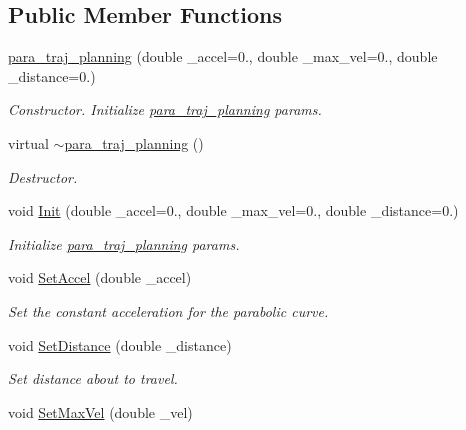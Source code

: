 \subsection*{Public Member Functions}
\begin{DoxyCompactItemize}
\item 
\hyperlink{classnubot_1_1para__traj__planning_a1300969c1d26ae23945d2ac1bc428a96}{para\-\_\-traj\-\_\-planning} (double \-\_\-accel=0., double \-\_\-max\-\_\-vel=0., double \-\_\-distance=0.)
\begin{DoxyCompactList}\small\item\em Constructor. Initialize \hyperlink{classnubot_1_1para__traj__planning}{para\-\_\-traj\-\_\-planning} params. \end{DoxyCompactList}\item 
virtual \hyperlink{classnubot_1_1para__traj__planning_ac091cb7cbef52a262db8952f52dc717d}{$\sim$para\-\_\-traj\-\_\-planning} ()
\begin{DoxyCompactList}\small\item\em Destructor. \end{DoxyCompactList}\item 
void \hyperlink{classnubot_1_1para__traj__planning_a18420bf66ac499e432718b9c6faab5b2}{Init} (double \-\_\-accel=0., double \-\_\-max\-\_\-vel=0., double \-\_\-distance=0.)
\begin{DoxyCompactList}\small\item\em Initialize \hyperlink{classnubot_1_1para__traj__planning}{para\-\_\-traj\-\_\-planning} params. \end{DoxyCompactList}\item 
void \hyperlink{classnubot_1_1para__traj__planning_acacb310a853b8045c860fd4735610b70}{Set\-Accel} (double \-\_\-accel)
\begin{DoxyCompactList}\small\item\em Set the constant acceleration for the parabolic curve. \end{DoxyCompactList}\item 
void \hyperlink{classnubot_1_1para__traj__planning_a52da7443d436abac47ea0a84fb734032}{Set\-Distance} (double \-\_\-distance)
\begin{DoxyCompactList}\small\item\em Set distance about to travel. \end{DoxyCompactList}\item 
void \hyperlink{classnubot_1_1para__traj__planning_ae85df349fd73029b13b60ca13a60c37d}{Set\-Max\-Vel} (double \-\_\-vel)

\end{DoxyCompactItemize}
